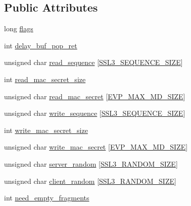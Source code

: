 \subsection*{Public Attributes}
\begin{DoxyCompactItemize}
\item 
long \hyperlink{structssl3__state__st_a8565ca9c9bebf7a771a99ef035ff6503}{flags}
\item 
int \hyperlink{structssl3__state__st_a27a3b6185c010f82d22bfcd7feb5a43f}{delay\+\_\+buf\+\_\+pop\+\_\+ret}
\item 
unsigned char \hyperlink{structssl3__state__st_a4688d677afb6b8193bd777af475c5871}{read\+\_\+sequence} \mbox{[}\hyperlink{ssl3_8h_a9ec2545ecc6f7f113be9cd1e5fcb2114}{S\+S\+L3\+\_\+\+S\+E\+Q\+U\+E\+N\+C\+E\+\_\+\+S\+I\+ZE}\mbox{]}
\item 
int \hyperlink{structssl3__state__st_a5f9e172ca1b931c4bb0bb44e80898d15}{read\+\_\+mac\+\_\+secret\+\_\+size}
\item 
unsigned char \hyperlink{structssl3__state__st_a650dfa61b083a05fafa16b3c62d6fe69}{read\+\_\+mac\+\_\+secret} \mbox{[}\hyperlink{evp_8h_a71bfc78a168f00f0c4ffd2535082b129}{E\+V\+P\+\_\+\+M\+A\+X\+\_\+\+M\+D\+\_\+\+S\+I\+ZE}\mbox{]}
\item 
unsigned char \hyperlink{structssl3__state__st_a905c2e9c2e534832459c81374bc0eb34}{write\+\_\+sequence} \mbox{[}\hyperlink{ssl3_8h_a9ec2545ecc6f7f113be9cd1e5fcb2114}{S\+S\+L3\+\_\+\+S\+E\+Q\+U\+E\+N\+C\+E\+\_\+\+S\+I\+ZE}\mbox{]}
\item 
int \hyperlink{structssl3__state__st_a916b1cd43d422b48e52b779e79432b5c}{write\+\_\+mac\+\_\+secret\+\_\+size}
\item 
unsigned char \hyperlink{structssl3__state__st_a2b686268d62c7756883eea3d9f77926a}{write\+\_\+mac\+\_\+secret} \mbox{[}\hyperlink{evp_8h_a71bfc78a168f00f0c4ffd2535082b129}{E\+V\+P\+\_\+\+M\+A\+X\+\_\+\+M\+D\+\_\+\+S\+I\+ZE}\mbox{]}
\item 
unsigned char \hyperlink{structssl3__state__st_ae0e0d20a2153469e1f0ee40b5852392b}{server\+\_\+random} \mbox{[}\hyperlink{ssl3_8h_a359c4c2030a5af4ab2c0ebd10766b53e}{S\+S\+L3\+\_\+\+R\+A\+N\+D\+O\+M\+\_\+\+S\+I\+ZE}\mbox{]}
\item 
unsigned char \hyperlink{structssl3__state__st_a08ccdbf1359a0d714bb7c1934dc3e7d4}{client\+\_\+random} \mbox{[}\hyperlink{ssl3_8h_a359c4c2030a5af4ab2c0ebd10766b53e}{S\+S\+L3\+\_\+\+R\+A\+N\+D\+O\+M\+\_\+\+S\+I\+ZE}\mbox{]}
\item 
int \hyperlink{structssl3__state__st_aa7dc2c2f9d03ff717c3aef1051784357}{need\+\_\+empty\+\_\+fragments}

\end{DoxyCompactItemize}

